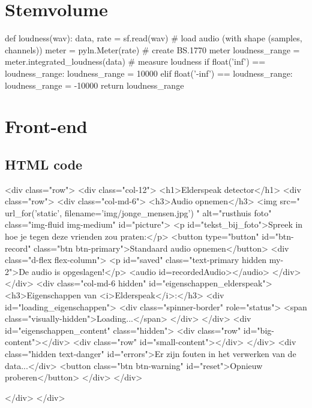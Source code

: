 \section{Stemvolume}
\label{bijlage:stemvolume}
\begin{python}
def loudness(wav):
    data, rate = sf.read(wav)  # load audio (with shape (samples, channels))
    meter = pyln.Meter(rate)  # create BS.1770 meter
    loudness_range = meter.integrated_loudness(data)  # measure loudness
    if float('inf') == loudness_range:
        loudness_range = 10000
    elif float('-inf') == loudness_range:
        loudness_range = -10000
    return loudness_range
\end{python}

\section{Front-end}
\subsection{HTML code}
\label{bijlage:html}
\begin{python}
<div class="row">
<div class="col-12">
<h1>Elderspeak detector</h1>
<div class="row">
<div class="col-md-6">
<h3>Audio opnemen</h3>
<img src="{{ url_for('static', filename='img/jonge_mensen.jpg') }}" alt="rusthuis foto" class="img-fluid img-medium" id="picture">
<p id="tekst_bij_foto">Spreek in hoe je tegen deze vrienden zou praten:</p>
<button type="button" id="btn-record" class="btn btn-primary">Standaard audio opnemen</button>
<div class="d-flex flex-column">
<p id="saved" class="text-primary hidden my-2">De audio is opgeslagen!</p>
<audio id=recordedAudio></audio>
</div>
</div>
<div class="col-md-6 hidden" id="eigenschappen_elderspeak">
<h3>Eigenschappen van <i>Elderspeak</i>:</h3>
<div id="loading_eigenschappen">
<div class="spinner-border" role="status">
<span class="visually-hidden">Loading...</span>
</div>
</div>
<div id="eigenschappen_content" class="hidden">
<div class="row" id="big-content"></div>
<div class="row" id="small-content"></div>
</div>
<div class="hidden text-danger" id="errors">Er zijn fouten in het verwerken van de data...</div>
<button class="btn btn-warning" id="reset">Opnieuw proberen</button>
</div>
</div>

</div>
</div>
\end{python}


